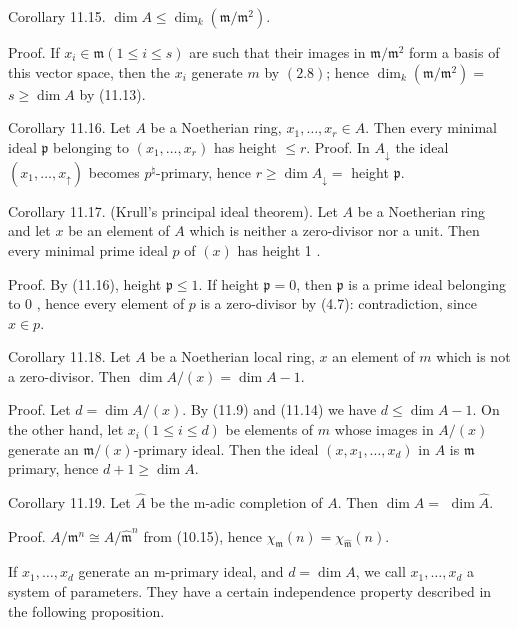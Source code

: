\documentclass{standalone}
\theoremstyle{definition}
\theoremstyle{remark}
\begin{document}
Corollary 11.15. $\operatorname{dim} A \leqslant \operatorname{dim}_{k}\left(\mathfrak{m} / \mathfrak{m}^{2}\right)$.

Proof. If $x_{i} \in \mathfrak{m}(1 \leqslant i \leqslant s)$ are such that their images in $\mathfrak{m} / \mathfrak{m}^{2}$ form a basis of this vector space, then the $x_{i}$ generate $m$ by $(2.8)$; hence $\operatorname{dim}_{k}\left(\mathfrak{m} / \mathfrak{m}^{2}\right)=$ $s \geqslant \operatorname{dim} A$ by (11.13).

Corollary 11.16. Let $A$ be a Noetherian ring, $x_{1}, \ldots, x_{r} \in A$. Then every minimal ideal $\mathfrak{p}$ belonging to $\left(x_{1}, \ldots, x_{r}\right)$ has height $\leqslant r$. Proof. In $A_{\downarrow}$ the ideal $\left(x_{1}, \ldots, x_{\uparrow}\right)$ becomes $p^{\natural}$-primary, hence $r \geqslant \operatorname{dim} A_{\downarrow}=$ height $\mathfrak{p}$.

Corollary 11.17. (Krull's principal ideal theorem). Let $A$ be a Noetherian ring and let $x$ be an element of $A$ which is neither a zero-divisor nor a unit. Then every minimal prime ideal $p$ of $(x)$ has height 1 .

Proof. By (11.16), height $\mathfrak{p} \leqslant 1$. If height $\mathfrak{p}=0$, then $\mathfrak{p}$ is a prime ideal belonging to 0 , hence every element of $p$ is a zero-divisor by (4.7): contradiction, since $x \in p$.

Corollary 11.18. Let $A$ be a Noetherian local ring, $x$ an element of $m$ which is not a zero-divisor. Then $\operatorname{dim} A /(x)=\operatorname{dim} A-1$.

Proof. Let $d=\operatorname{dim} A /(x)$. By (11.9) and (11.14) we have $d \leqslant \operatorname{dim} A-1$. On the other hand, let $x_{i}(1 \leqslant i \leqslant d)$ be elements of $m$ whose images in $A /(x)$ generate an $\mathfrak{m} /(x)$-primary ideal. Then the ideal $\left(x, x_{1}, \ldots, x_{d}\right)$ in $A$ is $\mathfrak{m}$ primary, hence $d+1 \geqslant \operatorname{dim} A$.

Corollary 11.19. Let $\hat{A}$ be the m-adic completion of $A$. Then $\operatorname{dim} A=$ $\operatorname{dim} \hat{A}$.

Proof. $A / \mathfrak{m}^{n} \cong A / \hat{\mathfrak{m}}^{n}$ from (10.15), hence $\chi_{\mathfrak{m}}(n)=\chi_{\hat{\mathfrak{m}}}(n)$.

If $x_{1}, \ldots, x_{d}$ generate an m-primary ideal, and $d=\operatorname{dim} A$, we call $x_{1}, \ldots, x_{d}$ a system of parameters. They have a certain independence property described in the following proposition.
\end{document}
